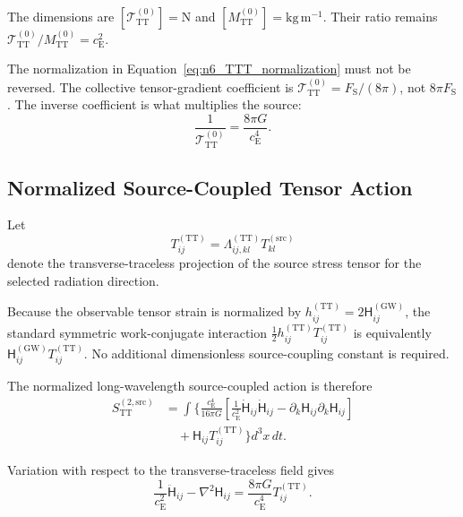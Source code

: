 The dimensions are $[\mathcal{T}_{\mathrm{TT}}^{(0)}] = \mathrm{N}$ and $[M_{\mathrm{TT}}^{(0)}] = \mathrm{kg\,m^{-1}}$. Their ratio remains $\mathcal{T}_{\mathrm{TT}}^{(0)} / M_{\mathrm{TT}}^{(0)} = c_{\mathrm{E}}^{2}$.

The normalization in Equation~\eqref{eq:n6_TTT_normalization} must not be reversed. The collective tensor-gradient coefficient is $\mathcal{T}_{\mathrm{TT}}^{(0)} = F_{\mathrm{S}} / (8\pi)$, not $8\pi F_{\mathrm{S}}$. The inverse coefficient is what multiplies the source:
\begin{equation}
    \frac{1}{\mathcal{T}_{\mathrm{TT}}^{(0)}} = \frac{8\pi G}{c_{\mathrm{E}}^{4}}.
\end{equation}

\subsection{Normalized Source-Coupled Tensor Action}
\label{subsec:n6_source_coupled_action}

Let
\begin{equation}
    T_{ij}^{(\mathrm{TT})} = \Lambda_{ij,kl}^{(\mathrm{TT})} T_{kl}^{(\mathrm{src})}
\end{equation}
denote the transverse-traceless projection of the source stress tensor for the selected radiation direction.

Because the observable tensor strain is normalized by $h_{ij}^{(\mathrm{TT})} = 2\mathsf{H}_{ij}^{(\mathrm{GW})}$, the standard symmetric work-conjugate interaction $\frac{1}{2} h_{ij}^{(\mathrm{TT})} T_{ij}^{(\mathrm{TT})}$ is equivalently $\mathsf{H}_{ij}^{(\mathrm{GW})} T_{ij}^{(\mathrm{TT})}$. No additional dimensionless source-coupling constant is required.

The normalized long-wavelength source-coupled action is therefore
\begin{equation}
    \begin{aligned}
        S_{\mathrm{TT}}^{(2,\mathrm{src})} &= \int \Bigg\{ \frac{c_{\mathrm{E}}^{4}}{16\pi G} \left[ \frac{1}{c_{\mathrm{E}}^{2}} \dot{\mathsf{H}}_{ij} \dot{\mathsf{H}}_{ij} - \partial_{k}\mathsf{H}_{ij} \partial_{k}\mathsf{H}_{ij} \right] \\
        &\quad + \mathsf{H}_{ij} T_{ij}^{(\mathrm{TT})} \Bigg\} d^{3}x\,dt.
    \end{aligned}
    \label{eq:n6_normalized_source_action}
\end{equation}

Variation with respect to the transverse-traceless field gives
\begin{equation}
    \frac{1}{c_{\mathrm{E}}^{2}} \ddot{\mathsf{H}}_{ij} - \nabla^{2}\mathsf{H}_{ij} = \frac{8\pi G}{c_{\mathrm{E}}^{4}} T_{ij}^{(\mathrm{TT})}.
    \label{eq:n6_sourced_tensor_equation}
\end{equation}

